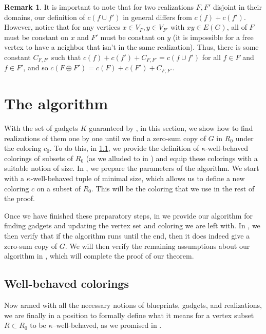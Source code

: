 \documentclass{article}
\theoremstyle{definition}
\newtheorem{remark}[theorem]{Remark}
\begin{document}
\begin{remark}\label{oplus}
     It is important to note that for two realizations $F,F'$ disjoint in their domains, our definition of $c(f\cup f')$ in general differs from $c(f)+c(f')$. However, notice that for any vertices $x\in V_F, y\in V_{F'}$ with $xy\in E(G)$, all of $F$ must be constant on $x$ and $F'$ must be constant on $y$ (it is impossible for a free vertex to have a neighbor that isn't in the same realization). Thus, there is some constant $C_{F,F'}$ such that $c(f)+c(f')+C_{F,F'} = c(f\cup f')$ for all $f\in F$ and $f\in F'$, and so $c(F\oplus F') = c(F) + c(F') + C_{F,F'}.$
\end{remark}



\section{The algorithm}\label{Sec.algorithm}
With the set of gadgets $K$ guaranteed by , in this section, we show how to find realizations of them one by one until we find a zero-sum copy of $G$ in $R_0$ under the coloring $c_0$. To do this, in \cref{sec:wllbehaved}, we provide the definition of $\kappa$-well-behaved colorings of subsets of $R_0$ (as we alluded to in ) and equip these colorings with a suitable notion of size. In , we prepare the parameters of the algorithm. We start with a $\kappa$-well-behaved tuple of minimal size, which allows us to define a new coloring $c$ on a subset of $R_0$. This will be the coloring that we use in the rest of the proof. 

Once we have finished these preparatory steps, in  we provide our algorithm for finding gadgets and updating the vertex set and coloring we are left with. In , we then verify that if the algorithm runs until the end, then it does indeed give a zero-sum copy of $G$. We will then verify the remaining assumptions about our algorithm in , which will complete the proof of our theorem.

\subsection{Well-behaved colorings}\label{sec:wllbehaved}

Now armed with all the necessary notions of blueprints, gadgets, and realizations, we are finally in a position to formally define what it means for a vertex subset $R\subset R_0$ to be $\kappa$--well-behaved, as we promised in .
\end{document}
